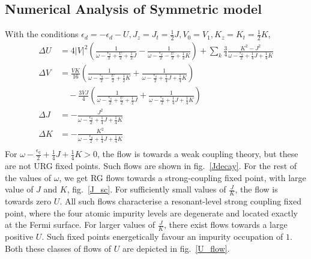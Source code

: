 \documentclass[12pt,twoside]{article}
\numberwithin{equation}{section}
\begin{document}
\subsection{Numerical Analysis of Symmetric model}
With the conditions \(\epsilon_d = -\epsilon_d - U, J_z = J_t = \frac{1}{2}J, V_0 = V_1, K_z = K_t = \frac{1}{2}K\),
\begin{equation}\begin{aligned}
	\Delta U &= 4|V|^2 \left(\frac{1}{\omega - \frac{\epsilon_q}{2} + \frac{U}{2} + \frac{1}{2}J}  - \frac{1}{\omega - \frac{\epsilon_q}{2} - \frac{U}{2} + \frac{1}{2}K}\right) + \sum_k \frac{3}{4}\frac{K^2 - J^2}{\omega - \frac{\epsilon_q}{2} + \frac{1}{4}J + \frac{1}{4}K} \\
	\Delta V &= \frac{V K}{16}\left( \frac{1}{\omega - \frac{\epsilon_q}{2} - \frac{U}{2} + \frac{1}{2}K} + \frac{1}{\omega - \frac{\epsilon_q}{2} + \frac{1}{4}J + \frac{1}{4}K} \right) \\
		 &\quad- \frac{3VJ}{4}\left( \frac{1}{\omega - \frac{\epsilon_q}{2} + \frac{U}{2} + \frac{1}{2}J} + \frac{1}{\omega - \frac{\epsilon_q}{2} + \frac{1}{4}J + \frac{1}{4}K} \right) \\
	\Delta J &= - \frac{J^2}{\omega - \frac{\epsilon_q}{2} + \frac{1}{4}J + \frac{1}{4}K}\\
	\Delta K &= - \frac{K^2}{\omega - \frac{\epsilon_q}{2} + \frac{1}{4}J + \frac{1}{4}K}\\
\end{aligned}\end{equation}
For \(\omega - \frac{\epsilon_q}{2} + \frac{1}{4}J + \frac{1}{4}K > 0\), the flow is towards a weak coupling theory, but these are not URG fixed points. Such flows are shown in fig.~\ref{Jdecay}. For the rest of the values of \(\omega\), we get RG flows towards a strong-coupling fixed point, with large value of \(J\) and \(K\), fig.~\ref{J_sc}. For sufficiently small values of \(\frac{J}{K}\), the flow is towards zero \(U\). All such flows characterise a resonant-level strong coupling fixed point, where the four atomic impurity levels are degenerate and located exactly at the Fermi surface. For larger values of \(\frac{J}{K}\), there exist flows towards a large positive \(U\). Such fixed points energetically favour an impurity occupation of \(1\). Both these classes of flows of \(U\) are depicted in fig.~\ref{U_flow}.
\end{document}
